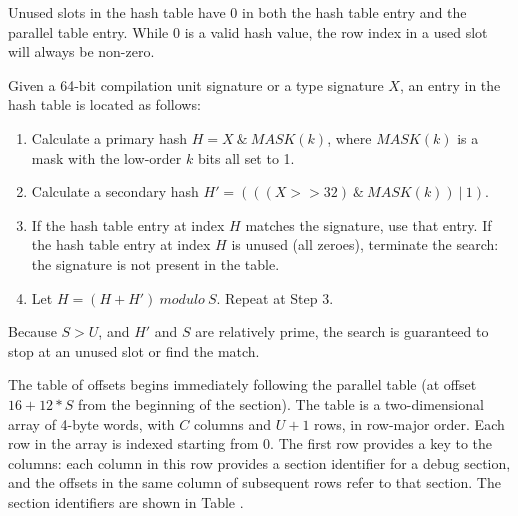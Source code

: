Unused slots in the hash table have 0 in both the hash table
entry and the parallel table entry. While 0 is a valid hash
value, the row index in a used slot will always be non-zero.

Given a 64-bit compilation unit signature or a type signature $X$,
an entry in the hash table is located as follows:
\begin{enumerate}[1. ]
\item Calculate a primary hash $H = X\ \&\ MASK(k)$, where $MASK(k)$ is a
    mask with the low-order $k$ bits all set to 1.

\item Calculate a secondary hash $H' = (((X>>32)\ \&\ MASK(k))\ |\ 1)$.

\item If the hash table entry at index $H$ matches the signature, use
    that entry. If the hash table entry at index $H$ is unused (all
    zeroes), terminate the search: the signature is not present
    in the table.

\item Let $H = (H + H')\ modulo\ S$. Repeat at Step 3.
\end{enumerate}

Because $S > U$, and $H'$ and $S$ are relatively prime, the search is
guaranteed to stop at an unused slot or find the match.

The table of offsets begins immediately following the parallel
table (at offset \mbox{$16 + 12 * S$} from the beginning of the section).
The table is a two-dimensional array of 4-byte words, 
with $C$ columns and $U + 1$
rows, in row-major order. Each row in the array is indexed
starting from 0. The first row provides a key to the columns:
each column in this row provides a section identifier for a debug
section, and the offsets in the same column of subsequent rows
refer to that section. The section identifiers are shown in
Table .

